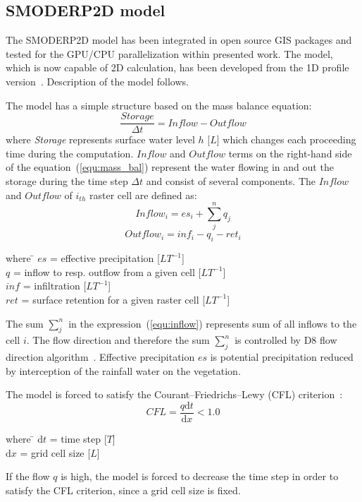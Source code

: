 \subsection{SMODERP2D model}
The SMODERP2D model has been integrated in open source 
GIS packages and tested for the GPU/CPU parallelization
within presented work. The model, which is now capable of 2D
calculation, has been developed from the 1D profile version~\cite{Holy1984}. 
Description of the model follows.

The model has a simple structure based on the mass balance equation:
\begin{equation}\label{equ:mass_bal}
    \frac{Storage}{\Delta t} = \nonumber  
    Inflow - Outflow
\end{equation}
where {\it Storage} represents 
surface water level $h$ [$L$] which changes each proceeding time
during the computation. $Inflow$ and $Outflow$ terms on the right-hand side of
the equation~(\ref{equ:mass_bal}) represent the water flowing in and out the storage 
during the time step ${\Delta t}$ and consist of several components.
The $Inflow$ and $Outflow$ of $i_{th}$ raster cell are defined as:
\begin{equation}\label{equ:inflow}
    Inflow_i = es_{i} + \sum_j^n q_{j}
\end{equation}
\begin{equation}\label{equ:outflow}
    Outflow_i = inf_{i} - q_{i} - ret_i
\end{equation}
\begin{tabbing} 
where \hspace{0.1cm} \= $es$ = effective precipitation [$LT^{-1}$]\\
\> $q$ = inflow to resp. outflow from a given cell [$LT^{-1}$]\\
\> $inf$ = infiltration [$LT^{-1}$]\\
\> $ret$ = surface retention for a given raster cell [$LT^{-1}$]
\end{tabbing}
The sum $\sum_j^n$ in the expression~(\ref{equ:inflow}) represents sum of all inflows to the cell $i$. 
The flow direction and therefore the sum $\sum_j^n$
is controlled by D8 flow direction algorithm~\cite{ocallaghan1984}.  Effective
precipitation $es$ is potential precipitation reduced by
interception of the rainfall water on the vegetation.

The model is forced to satisfy the Courant--Friedrichs--Lewy (CFL)
criterion~\cite{courant1928}:
\begin{equation}\label{equ:CFL}
    CFL = \frac{q\textrm{d}t}{\textrm{d}x} < 1.0
\end{equation}
\begin{tabbing} 
where \hspace{0.6cm} \= $\textrm{d}t$ = time step [$T$]\\
\> $\textrm{d}x$ = grid cell size [$L$]
\end{tabbing}
If the flow $q$ is high, the model is forced to decrease the
time step in order to satisfy the CFL criterion, since a grid cell size
is fixed.

